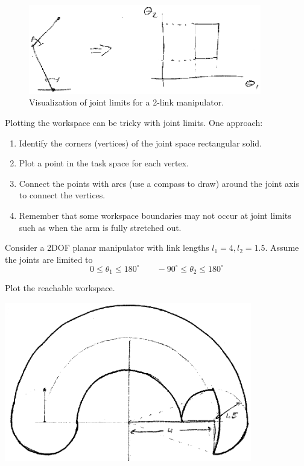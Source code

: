 \begin{figure}\centering
\includegraphics[width =4.0in]{figs04/00444.eps}
\caption{Visualization of joint limits for a 2-link manipulator.}\label{2LinkVisJointLimits}
\end{figure}



Plotting the workspace can be tricky with joint limits.   One approach:
\begin{enumerate}
	\item Identify the corners (vertices) of the joint space rectangular solid.
	\item Plot a point in the task space for each vertex.
	\item Connect the points with arcs (use a compass to draw) around the joint axis to connect the vertices.
	\item Remember that some workspace boundaries may not occur at joint limits such as when the arm is fully stretched out.
\end{enumerate}



\begin{ExampleSmall}\label{2LinkJointLimits}
Consider a 2DOF planar manipulator with link lengths $l_1 = 4, l_2 = 1.5$.    Assume the joints are limited to
\[
0 \le \theta_1 \le 180^{\circ}   \qquad   -90^{\circ} \le \theta_2 \le 180^{\circ}
\]

Plot the reachable workspace.

\includegraphics[width=4.25in]{figs04/00445.eps}

\end{ExampleSmall}

